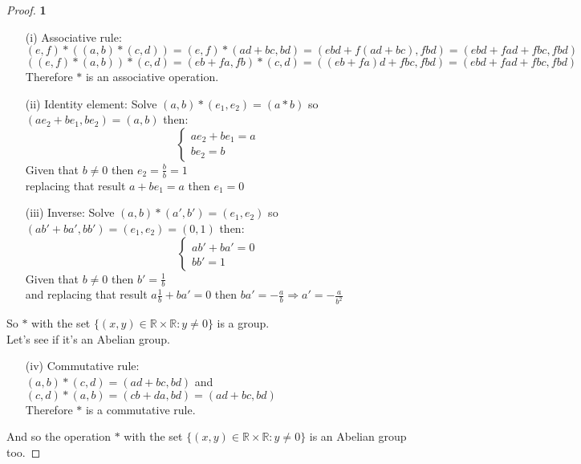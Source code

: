\documentclass[11pt]{article}
\begin{document}
		\begin{proof}{\textbf{1}}
		\begin{itemize}
			\item [(i)] Associative rule:\\
			$(e,f)*((a, b)*(c,d)) = (e,f)*(ad+bc,bd) = (ebd+f(ad+bc),fbd)=(ebd+fad+fbc,fbd)$ \\
			$((e,f)*(a,b))*(c,d) = (eb+fa,fb)*(c,d) = ((eb+fa)d+fbc,fbd)=(ebd+fad+fbc,fbd)$\\
			Therefore $*$ is an associative operation.
			\item [(ii)] Identity element: Solve $(a,b) *(e_1, e_2) = (a*b)$ so\\
			$(ae_2+be_1,be_2) = (a,b)$ then:
			\begin{equation*}
    			\begin{cases}
      				ae_2+be_1 = a\\
      				be_2=b
    			\end{cases}
			\end{equation*}
			Given that $b \neq 0$ then $e_2 = \frac{b}{b} = 1$\\
			replacing that result $a+be_1 = a$ then $e_1 = 0$
			\item [(iii)] Inverse: Solve $(a,b)*(a',b')=(e_1,e_2)$ so\\
			$(ab'+ba',bb') = (e_1,e_2) = (0,1)$ then:
			\begin{equation*}
    			\begin{cases}
      				ab'+ba' = 0\\
      				bb'=1
    			\end{cases}
			\end{equation*}
			Given that $b \neq 0$ then $b' = \frac{1}{b}$ \\
			and replacing that result $a\frac{1}{b} + ba'=0$ then $ba' = -\frac{a}{b} \Rightarrow a'=-\frac{a}{b^2}$
		\end{itemize}
		So $*$ with the set $\{(x,y) \in \mathbb{R} \times \mathbb{R}: y \neq 0\}$ is a group.\\
		Let's see if it's an Abelian group.
			\begin{itemize}
			\item [(iv)] Commutative rule:\\
			$(a,b)*(c,d) = (ad+bc,bd)$ and \\
			$(c,d)*(a,b) = (cb+da,bd)=(ad+bc,bd)$\\
			Therefore $*$ is a commutative rule. 
			\end{itemize}
		And so the operation $*$ with the set $\{(x,y) \in \mathbb{R} \times \mathbb{R}: y \neq 0\}$ is an Abelian group too.
		\end{proof}
\end{document}

